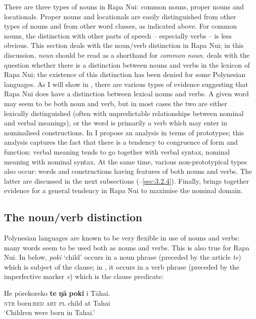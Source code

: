 There are three types of nouns in Rapa Nui: common nouns, proper nouns and locationals. Proper nouns and locationals are easily distinguished from other types of nouns and from other word classes, as indicated above. For common nouns, the distinction with other parts of speech – especially verbs – is less obvious. This section deals with the noun/verb distinction in Rapa Nui; in this discussion, \textit{noun} should be read as a shorthand for \textit{common noun}.  deals with the question whether there is a distinction between nouns and verbs in the lexicon of Rapa Nui; the existence of this distinction has been denied for some Polynesian languages. As I will show in , there are various types of evidence suggesting that Rapa Nui does have a distinction between lexical nouns and verbs. A given word may seem to be both noun and verb, but in most cases the two are either lexically distinguished (often with unpredictable relationships between nominal and verbal meanings), or the word is primarily a verb which may enter in nominalised constructions. In  I propose an analysis in terms of prototypes; this analysis captures the fact that there is a tendency to congruence of form and function: verbal meaning tends to go together with verbal syntax, nominal meaning with nominal syntax. At the same time, various non-prototypical types also occur: words and constructions having features of both nouns and verbs. The latter are discussed in the\textsubscript{} next subsections (–\ref{sec:3.2.4}). Finally,  brings together evidence for a general tendency in Rapa Nui to maximise the nominal domain.

\subsection{The noun/verb distinction}\label{sec:3.2.1}

Polynesian languages are known to be very flexible in use of nouns and verbs: many words seem to be used both as nouns and verbs. This is also true for Rapa Nui. In  below, \textit{poki} ‘child’ occurs in a noun phrase (preceded by the article \textit{te}) which is subject of the clause; in , it occurs in a verb phrase (preceded by the imperfective marker \textit{e}) which is the clause predicate:

\ea\label{ex:3.1}
\gll He pōrekoreko \textbf{te} \textbf{ŋā} \textbf{poki} {\ꞌ}i Tāhai.\\
\textsc{ntr} born:\textsc{red} \textsc{art} \textsc{pl} child at Tahai\\
\glt 
‘Children were born in Tahai.’ \textstyleExampleref{[Ley-4-08.10]}
\z

